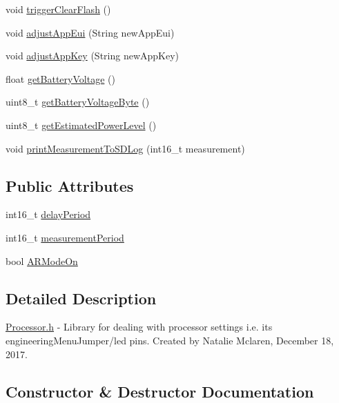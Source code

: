 \begin{DoxyCompactItemize}
\item 
void \mbox{\hyperlink{class_processor_a8083069e032fcd6e38c97cc31475200a}{trigger\+Clear\+Flash}} ()
\item 
void \mbox{\hyperlink{class_processor_a9e5c642ce356b8aebe5998158f31ded5}{adjust\+App\+Eui}} (String new\+App\+Eui)
\item 
void \mbox{\hyperlink{class_processor_adee07912124face3700bc988606b8f38}{adjust\+App\+Key}} (String new\+App\+Key)
\item 
float \mbox{\hyperlink{class_processor_aa467c82cb9a57d597487fc319c878c36}{get\+Battery\+Voltage}} ()
\item 
uint8\+\_\+t \mbox{\hyperlink{class_processor_ae2385e41f86895199fb37e524a3f1e86}{get\+Battery\+Voltage\+Byte}} ()
\item 
uint8\+\_\+t \mbox{\hyperlink{class_processor_a78b74d3be91182a263f77ff0f250408d}{get\+Estimated\+Power\+Level}} ()
\item 
void \mbox{\hyperlink{class_processor_aa60b755d3022b3b0f83f654e2b7e2e1d}{print\+Measurement\+To\+S\+D\+Log}} (int16\+\_\+t measurement)
\end{DoxyCompactItemize}
\subsection*{Public Attributes}
\begin{DoxyCompactItemize}
\item 
int16\+\_\+t \mbox{\hyperlink{class_processor_acfaad87bb46ff80f1b7966624542e6ef}{delay\+Period}}
\item 
int16\+\_\+t \mbox{\hyperlink{class_processor_a5cb8792cf0882b5466eea2b8e0816684}{measurement\+Period}}
\item 
bool \mbox{\hyperlink{class_processor_af51b6b3ce7074068195b5d3eb2442fdb}{A\+R\+Mode\+On}}
\end{DoxyCompactItemize}


\subsection{Detailed Description}
\mbox{\hyperlink{_processor_8h}{Processor.\+h}} -\/ Library for dealing with processor settings i.\+e. its engineering\+Menu\+Jumper/led pins. Created by Natalie Mclaren, December 18, 2017. 

\subsection{Constructor \& Destructor Documentation}
\mbox{\label{class_processor_a4e9231316672f0a9daf138a08065ea8f}} 
